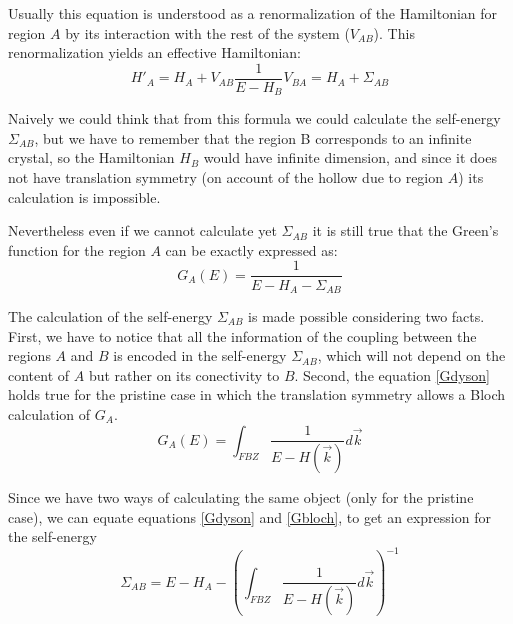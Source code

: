 Usually this equation is understood as a renormalization of the Hamiltonian for region $A$ by its interaction with the rest of the system ($V_{AB}$). This renormalization yields an effective Hamiltonian:
\begin{equation}
  H'_{A} = H_{A}+V_{AB}\frac{1}{E-H_{B}}V_{BA} = H_{A} + \Sigma_{AB}
\end{equation}

Naively we could think that from this formula we could calculate the self-energy $\Sigma_{AB}$, but we have to remember that the region B corresponds to an infinite crystal, so the Hamiltonian $H_{B}$ would have infinite dimension, and since it does not have translation symmetry (on account of the hollow due to region $A$) its calculation is impossible.

Nevertheless even if we cannot calculate yet $\Sigma_{AB}$ it is still true that the Green's function for the region $A$ can be exactly expressed as:
\begin{equation}
G_{A}(E) = \frac{1}{E - H_{A}-\Sigma_{AB}}
\label{Gdyson}
\end{equation}

The calculation of the self-energy $\Sigma_{AB}$ is made possible considering two facts. First, we have to notice that all the information of the coupling between the regions $A$ and $B$ is encoded in the self-energy $\Sigma_{AB}$, which will not depend on the content of $A$ but rather on its conectivity to $B$. Second, the equation \eqref{Gdyson} holds true for the pristine case in which the translation symmetry allows a Bloch calculation of $G_A$.
%
%
\begin{equation}
G_{A}(E) = \int_{FBZ}\frac{1}{E-H(\vec{k})}d\vec{k}
\label{Gbloch}
\end{equation}

Since we have two ways of calculating the same object (only for the pristine case), we can equate equations \eqref{Gdyson} and \eqref{Gbloch}, to get an expression for the self-energy
\begin{equation}
\Sigma_{AB} = E - H_{A} -\left(\int_{FBZ}\frac{1}{E-H(\vec{k})}d\vec{k}\right)^{-1}
\label{self-energy}
\end{equation}

